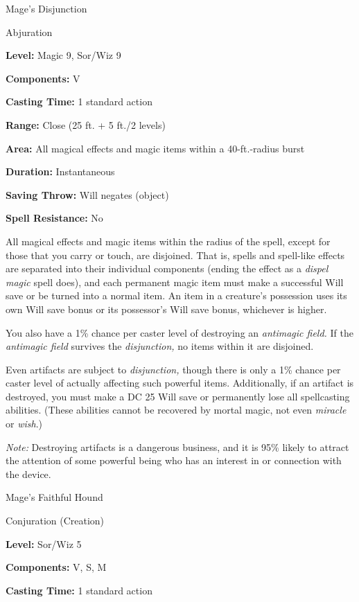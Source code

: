 \documentclass{article}
\begin{document}
\vspace{12pt}
Mage's Disjunction

Abjuration

\textbf{Level: }Magic 9, Sor/Wiz 9

\textbf{Components:} V

\textbf{Casting Time:} 1 standard action

\textbf{Range:} Close (25 ft. + 5 ft./2 levels)

\textbf{Area:} All magical effects and magic items within a 40-ft.-radius burst

\textbf{Duration:} Instantaneous

\textbf{Saving Throw: }Will negates (object)

\textbf{Spell Resistance:} No

All magical effects and magic items within the radius of the spell, except for 
those that you carry or touch, are disjoined. That is, spells and spell-like effects 
are separated into their individual components (ending the effect as a \textit{dispel 
magic }spell does), and each permanent magic item must make a successful Will save 
or be turned into a normal item. An item in a creature's possession uses its own 
Will save bonus or its possessor's Will save bonus, whichever is higher.

You also have a 1\% chance per caster level of destroying an \textit{antimagic 
field. }If the \textit{antimagic field }survives the \textit{disjunction, }no items 
within it are disjoined.

Even artifacts are subject to \textit{disjunction, }though there is only a 1\% 
chance per caster level of actually affecting such powerful items. Additionally, 
if an artifact is destroyed, you must make a DC 25 Will save or permanently lose 
all spellcasting abilities. (These abilities cannot be recovered by mortal magic, 
not even \textit{miracle }or \textit{wish}.)

\textit{Note: }Destroying artifacts is a dangerous business, and it is 95\% likely 
to attract the attention of some powerful being who has an interest in or connection 
with the device.

\vspace{12pt}
Mage's Faithful Hound

Conjuration (Creation)

\textbf{Level:} Sor/Wiz 5

\textbf{Components:} V, S, M

\textbf{Casting Time:} 1 standard action
\end{document}
